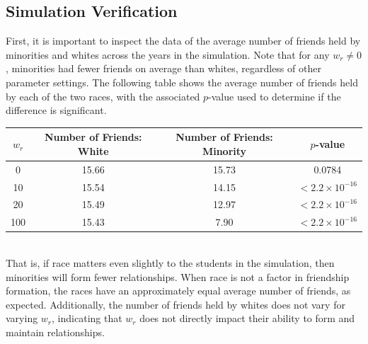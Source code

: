 \subsection{Simulation Verification}

First, it is important to inspect the data of the average number of friends held by minorities and whites across the years 
in the simulation. Note that for any $w_r\neq 0$, minorities had fewer friends on average than whites, regardless of other parameter settings. 
The following table shows the average number of friends held by each of the two races, with the associated $p$-value used to determine if 
the difference is significant.\\

\begin{center}
\begin{tabular}{|c|c|c|c|}
\hline
$w_r$ & Number of Friends: White & Number of Friends: Minority & $p$-value\\
\hline
0 & 15.66 & 15.73 & 0.0784\\
10 & 15.54 & 14.15 & $<2.2\times 10^{-16}$\\
20 & 15.49 & 12.97 & $<2.2\times 10^{-16}$\\
100 & 15.43 & 7.90 & $<2.2\times 10^{-16}$\\
\hline
\end{tabular}
\end{center}~~\\

That is, if race matters even slightly to the students in the simulation, then minorities will form fewer relationships. When race is not a factor in 
friendship formation, the races have an approximately equal average number of friends, as expected. Additionally, the number of friends held by whites 
does not vary for varying $w_r$, indicating that $w_r$ does not directly impact their ability to form and maintain relationships.


